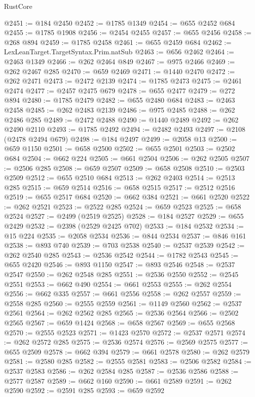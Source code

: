 \begin{lexlean}{RustCore}
\begin{coremodule}
@2451 := @184 @2450
@2452 := @1785 @1349
@2454 := @655 @2452 @684
@2455 := @1785 @1908
@2456 := @2454 @2455
@2457 := @655 @2456
@2458 := @268 @894
@2459 := @1785 @2458
@2461 := @655 @2459 @684
@2462 := LexLeanTarget.TargetSyntax.Prim.natSub
@2463 := @656 @2462
@2464 := @2463 @1349
@2466 := @262 @2464 @849
@2467 := @975 @2466
@2469 := @262 @2467 @285
@2470 := @659 @2469
@2471 := @1440 @2470
@2472 := @262 @2471
@2473 := @2472 @2139
@2474 := @1785 @2473
@2475 := @2461 @2474
@2477 := @2457 @2475 @679
@2478 := @655 @2477
@2479 := @272 @894
@2480 := @1785 @2479
@2482 := @655 @2480 @684
@2483 := @2463 @2458
@2485 := @262 @2483 @2139
@2486 := @975 @2485
@2488 := @262 @2486 @285
@2489 := @2472 @2488
@2490 := @1440 @2489
@2492 := @262 @2490 @2110
@2493 := @1785 @2492
@2494 := @2482 @2493
@2497 := @2108 (@2478 @2494 @679)
@2498 := @184 @2497
@2499 := @2058 @13
@2500 := @659 @1150
@2501 := @658 @2500
@2502 := @655 @2501
@2503 := @2502 @684
@2504 := @662 @224
@2505 := @661 @2504
@2506 := @262 @2505
@2507 := @2506 @285
@2508 := @659 @2507
@2509 := @658 @2508
@2510 := @2503 @2509
@2512 := @655 @2510 @684
@2513 := @262 @2403
@2514 := @2513 @285
@2515 := @659 @2514
@2516 := @658 @2515
@2517 := @2512 @2516
@2519 := @655 @2517 @684
@2520 := @662 @384
@2521 := @661 @2520
@2522 := @262 @2521
@2523 := @2522 @285
@2524 := @659 @2523
@2525 := @658 @2524
@2527 := @2499 (@2519 @2525)
@2528 := @184 @2527
@2529 := @655 @2429
@2532 := @2398 (@2529 @2425 @702)
@2533 := @184 @2532
@2534 := @15 @224
@2535 := @2058 @2534
@2536 := @844 @2534
@2537 := @846 @161
@2538 := @893 @740
@2539 := @703 @2538
@2540 := @2537 @2539
@2542 := @262 @2540 @285
@2543 := @2536 @2542
@2544 := @1782 @2543
@2545 := @655 @2420
@2546 := @893 @1150
@2547 := @893 @2546
@2548 := @2537 @2547
@2550 := @262 @2548 @285
@2551 := @2536 @2550
@2552 := @2545 @2551
@2553 := @662 @490
@2554 := @661 @2553
@2555 := @262 @2554
@2556 := @662 @335
@2557 := @661 @2556
@2558 := @262 @2557
@2559 := @2558 @285
@2560 := @2555 @2559
@2561 := @1149 @2560
@2562 := @2537 @2561
@2564 := @262 @2562 @285
@2565 := @2536 @2564
@2566 := @2502 @2565
@2567 := @659 @1424
@2568 := @658 @2567
@2569 := @655 @2568
@2570 := @2555 @2523
@2571 := @1423 @2570
@2572 := @2537 @2571
@2574 := @262 @2572 @285
@2575 := @2536 @2574
@2576 := @2569 @2575
@2577 := @655 @2509
@2578 := @662 @394
@2579 := @661 @2578
@2580 := @262 @2579
@2581 := @2580 @285
@2582 := @2555 @2581
@2583 := @2506 @2582
@2584 := @2537 @2583
@2586 := @262 @2584 @285
@2587 := @2536 @2586
@2588 := @2577 @2587
@2589 := @662 @160
@2590 := @661 @2589
@2591 := @262 @2590
@2592 := @2591 @285
@2593 := @659 @2592

\end{coremodule}
\end{lexlean}
